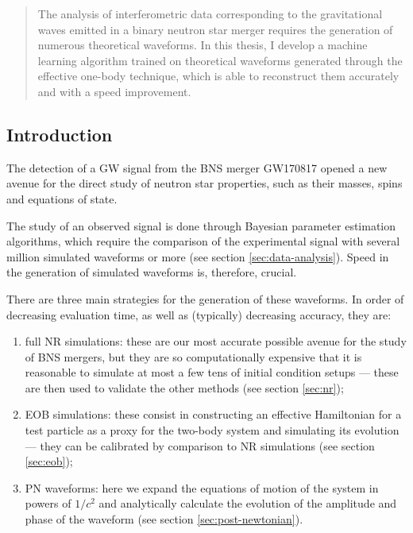 \documentclass[main.tex]{subfiles}
\begin{document}
\begin{abstract}
The analysis of interferometric data corresponding to the gravitational waves emitted in a binary neutron star merger requires the generation of numerous theoretical waveforms.
In this thesis, I develop a machine learning algorithm trained on theoretical waveforms generated through the effective one-body technique, which is able to reconstruct them accurately and with a speed improvement.
\end{abstract}




\subsection*{Introduction}

The detection of a \ac{GW} signal from the \ac{BNS} merger GW170817 \cite{abbottGW170817ObservationGravitational2017} opened a new avenue for the direct study of neutron star properties, such as their masses, spins and equations of state.

The study of an observed signal is done through Bayesian parameter estimation algorithms, which require the comparison of the experimental signal with several million \cite{lackeyEffectiveonebodyWaveformsBinary2017} simulated waveforms or more (see section \ref{sec:data-analysis}).
Speed in the generation of simulated waveforms is, therefore, crucial.

There are three main strategies for the generation of these waveforms. In order of decreasing evaluation time, as well as (typically) decreasing accuracy, they are:
\begin{enumerate}
    \item full \ac{NR} simulations: these are our most accurate possible avenue for the study of \ac{BNS} mergers, but they are so computationally expensive that it is reasonable to simulate at most a few tens of initial condition setups --- these are then used to validate the other methods (see section \ref{sec:nr});
    \item \ac{EOB} simulations: these consist in constructing an effective Hamiltonian for a test particle as a proxy for the two-body system and simulating its evolution --- they can be calibrated by comparison to \ac{NR} simulations (see section \ref{sec:eob});
    \item \ac{PN} waveforms: here we expand the equations of motion of the system in powers of $1/c^2$ and analytically calculate the evolution of the amplitude and phase of the waveform (see section \ref{sec:post-newtonian}).
\end{enumerate}
\end{document}
